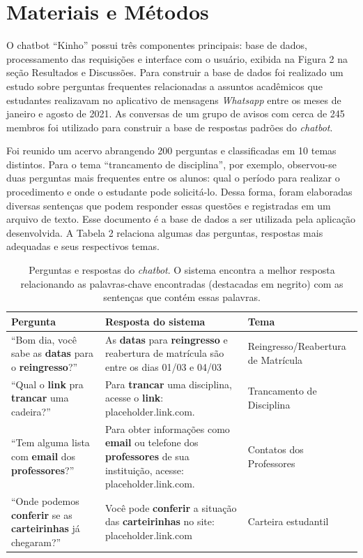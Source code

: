 \documentclass[12pt]{article}
\begin{document}
\section{Materiais e Métodos} \label{sec:firstpage}

O chatbot “Kinho” possui três componentes principais: base de dados, processamento das requisições e interface com o usuário, exibida na Figura 2 na seção Resultados e Discussões. Para construir a base de dados foi realizado um estudo sobre perguntas frequentes relacionadas a assuntos acadêmicos que estudantes realizavam no aplicativo de mensagens {\itshape Whatsapp} entre os meses de janeiro e agosto de 2021. As conversas de um grupo de avisos com cerca de 245 membros foi utilizado para construir a base de respostas padrões do {\itshape chatbot}.

Foi reunido um acervo abrangendo 200 perguntas e classificadas em 10 temas distintos. Para o tema “trancamento de disciplina”, por exemplo, observou-se duas perguntas mais frequentes entre os alunos: qual o período para realizar o procedimento e onde o estudante pode solicitá-lo. Dessa forma, foram elaboradas diversas sentenças que podem responder essas questões e registradas em um arquivo de texto. Esse documento é a base de dados a ser utilizada pela aplicação desenvolvida. A Tabela 2 relaciona algumas das perguntas, respostas mais adequadas e seus respectivos temas.

\begin{table}[h]
\caption{Perguntas e respostas do {\itshape chatbot}. O sistema encontra a melhor resposta relacionando as palavras-chave encontradas (destacadas em negrito) com as sentenças que contém essas palavras.}
\label{table:1}
\begin{tabular}{ |p{4.25cm}|p{5cm}|p{4.25cm}|  }
 \hline
Pergunta & Resposta do sistema & Tema\\
 \hline
 “Bom dia, você sabe as \textbf{datas} para o \textbf{reingresso}?”   & As \textbf{datas} para \textbf{reingresso} e reabertura de matrícula são entre os dias 01/03 e 04/03 &   Reingresso/Reabertura de Matrícula \\
 \hline
 “Qual o \textbf{link} pra \textbf{trancar} uma cadeira?”   & Para \textbf{trancar} uma disciplina, acesse o \textbf{link}: placeholder.link.com. &   Trancamento de Disciplina \\
 \hline
 “Tem alguma lista com \textbf{email} dos \textbf{professores}?”   & Para obter informações como \textbf{email} ou telefone dos \textbf{professores} de sua instituição, acesse: placeholder.link.com. &   Contatos dos Professores \\
 \hline
 “Onde podemos \textbf{conferir} se as \textbf{carteirinhas} já chegaram?”   & Você pode \textbf{conferir} a situação das \textbf{carteirinhas} no site: placeholder.link.com &   Carteira estudantil \\
 
 \hline
\end{tabular}
\end{table}
\end{document}
